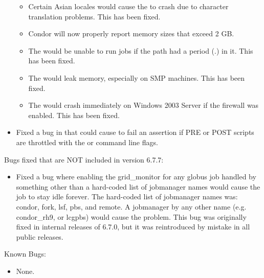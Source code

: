 \begin{itemize}
\begin{itemize}
  \item Certain Asian locales would cause the  to crash
  due to character translation problems. This has been fixed.

  \item Condor will now properly report memory sizes that exceed 2 GB.

  \item The  would be unable to run jobs if the \verb@LOG@
  path had a period (.) in it. This has been fixed.

  \item The  would leak memory, especially on SMP
  machines. This has been fixed.

  \item The  would crash immediately on Windows 2003
  Server if the firewall was enabled. This has been fixed.

\end{itemize}

\item Fixed a bug in  that could cause 
to fail an assertion if PRE or POST scripts are throttled with the
 or   command line flags.

\end{itemize}

\noindent Bugs fixed that are NOT included in version 6.7.7:

\begin{itemize}

\item Fixed a bug where enabling the grid\_monitor for any globus
job handled by something other than a hard-coded list of jobmanager names
would cause the job to stay idle forever.  The hard-coded list of
jobmanager names was: condor, fork, lsf, pbs, and remote.  A jobmanager
by any other name (e.g. condor\_rh9, or lcgpbs) would cause the problem.
This bug was originally fixed in internal releases of 6.7.0, but it was
reintroduced by mistake in all public releases.

\end{itemize}

\noindent Known Bugs:

\begin{itemize}

\item None.

\end{itemize}

